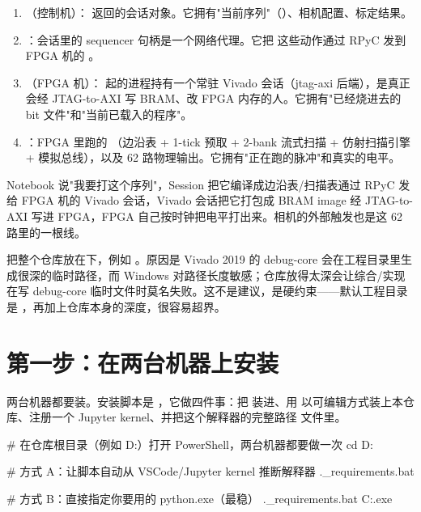 \documentclass[11pt,oneside,openany]{book}
\begin{document}
\begin{enumerate}
\item {}（控制机）： 返回的会话对象。它拥有"当前序列"（）、相机配置、标定结果。
\item {}：会话里的 sequencer 句柄是一个网络代理。它把  这些动作通过 RPyC 发到 FPGA 机的 。
\item {}（FPGA 机）： 起的进程持有一个常驻 Vivado  会话（jtag-axi 后端），是真正会经 JTAG-to-AXI 写 BRAM、改 FPGA 内存的人。它拥有"已经烧进去的 bit 文件"和"当前已载入的程序"。
\item {}：FPGA 里跑的 （边沿表 + 1-tick 预取 + 2-bank 流式扫描 + 仿射扫描引擎 + 模拟总线），以及 62 路物理输出。它拥有"正在跑的脉冲"和真实的电平。
\end{enumerate}

\begin{notebox}[一句话记忆]
Notebook 说"我要打这个序列"，Session 把它编译成边沿表/扫描表通过 RPyC 发给 FPGA 机的 Vivado 会话，Vivado 会话把它打包成 BRAM image 经 JTAG-to-AXI 写进 FPGA，FPGA 自己按时钟把电平打出来。相机的外部触发也是这 62 路里的一根线。
\end{notebox}

\begin{notebox}
把整个仓库放在下，例如 。原因是 Vivado 2019 的 debug-core 会在工程目录里生成很深的临时路径，而 Windows 对路径长度敏感；仓库放得太深会让综合/实现在写 debug-core 临时文件时莫名失败。这不是建议，是硬约束——默认工程目录是 ，再加上仓库本身的深度，很容易超界。
\end{notebox}

\section{第一步：在两台机器上安装}

两台机器都要装。安装脚本是 ，它做四件事：把  装进、用  以可编辑方式装上本仓库、注册一个 Jupyter kernel、并把这个解释器的完整路径  文件里。

\begin{codeblock}[PowerShell]
# 在仓库根目录（例如 D:\ZLC）打开 PowerShell，两台机器都要做一次
cd D:\ZLC

# 方式 A：让脚本自动从 VSCode/Jupyter kernel 推断解释器
.\install_requirements.bat

# 方式 B：直接指定你要用的 python.exe（最稳）
.\install_requirements.bat C:\Users\you{}\envs\zlc\python.exe
\end{codeblock}
\end{document}
